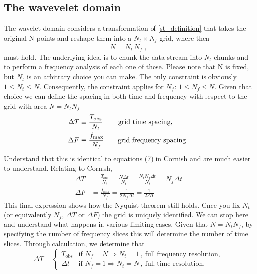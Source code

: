 \documentclass{article}
\begin{document}
\subsection{The wavevelet domain}\label{sec:wavelet_domain}
The wavelet domain considers a transformation of \eqref{st_definition} that takes the original N points and reshape them into a $N_t\times N_f$ grid, where then
\begin{align}\label{NtNf_def}
N=N_t\,N_f\;,
\end{align}
must hold. The underlying idea, is to chunk the data stream into $N_t$ chunks and to perform a frequency analysis of each one of those. Please note that N is fixed, but $N_t$ is an arbitrary choice you can make. The only constraint is obviously $1\le N_t\le N$. Consequently, the constraint applies for $N_f$: $1\le N_f\le N$.
Given that choice we can define the spacing in both time and frequency with respect to the grid with area $N = N_{t}N_{f}$
\begin{align}\label{DTDF}
\Delta T&\equiv\frac{T_{\text{obs}}}{N_t}\; \qquad \text{grid time spacing},\nonumber\\
\Delta F&\equiv\frac{f_{\rm max}}{N_f} \qquad \text{grid frequency spacing}\,.
\end{align}
Understand that this is identical to equations (7) in Cornish and are much easier to understand. Relating to Cornish,
\begin{align}
\Delta T &= \frac{T_{\text{obs}}}{N_{t}} = \frac{N\Delta t}{N_{t}} = \frac{N_{t}N_{f}\Delta t}{N_{t}} = N_{f}\Delta t \\
\Delta F &= \frac{f_{\text{max}}}{N_{f}} = \frac{1}{2N_{f}\Delta t} = \frac{1}{2\Delta T}
\end{align}
This final expression shows how the Nyquist theorem still holds. Once you fix $N_t$ (or equivalently $N_f$, $\Delta T$ or $\Delta F$) the grid is uniquely identified. We can stop here and understand what happens in various limiting cases. Given that $N = N_{t}N_{f}$, by specifying the number of frequency slices this will determine the number of time slices. Through calculation, we determine that 
\begin{equation}
\Delta T = 
\begin{cases} 
T_{\text{obs}} & \text{if } N_{f} = N \Rightarrow N_{t} = 1\,, \ \text{full frequency resolution}, \\
\Delta t & \text{if } N_{f} = 1 \Rightarrow N_{t} = N\,, \ \text{full time resolution}.
\end{cases}
\end{equation}
\end{document}
